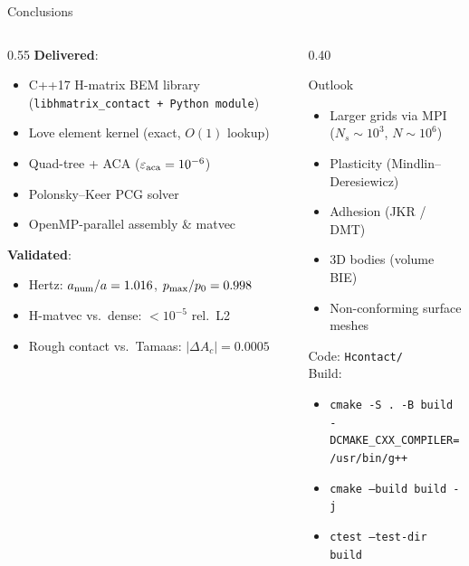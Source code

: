 \begin{frame}{Conclusions}
\begin{columns}[T]
\begin{column}{0.55\textwidth}
  \textbf{Delivered}:
  \begin{itemize}
    \item C++17 H-matrix BEM library
      (\texttt{libhmatrix\_contact + Python module})
    \item Love element kernel (exact, $O(1)$ lookup)
    \item Quad-tree + ACA ($\varepsilon_{\rm aca}=10^{-6}$)
    \item Polonsky--Keer PCG solver
    \item OpenMP-parallel assembly \& matvec
  \end{itemize}

  \vspace{0.5em}
  \textbf{Validated}:
  \begin{itemize}
    \item Hertz: $a_{\rm num}/a = 1.016$,
      $p_{\rm max}/p_0 = 0.998$
    \item H-matvec vs.\ dense: $<10^{-5}$ rel.\ L2
    \item Rough contact vs.\ Tamaas: $|\Delta A_c|=0.0005$
  \end{itemize}
\end{column}
\begin{column}{0.40\textwidth}
  \begin{block}{Outlook}
    \begin{itemize}
      \item Larger grids via MPI\\
        ($N_s \sim 10^3$, $N\sim10^6$)
      \item Plasticity (Mindlin--Deresiewicz)
      \item Adhesion (JKR / DMT)
      \item 3D bodies (volume BIE)
      \item Non-conforming surface meshes
    \end{itemize}
  \end{block}
  \vspace{0.4em}
  \small
  Code: \texttt{Hcontact/} \\
  Build:
  \begin{itemize}
    \item \texttt{cmake -S . -B build}\\
      \texttt{\;\;-DCMAKE\_CXX\_COMPILER=/usr/bin/g++}
    \item \texttt{cmake --build build -j}
    \item \texttt{ctest --test-dir build}
  \end{itemize}
\end{column}
\end{columns}
\end{frame}
